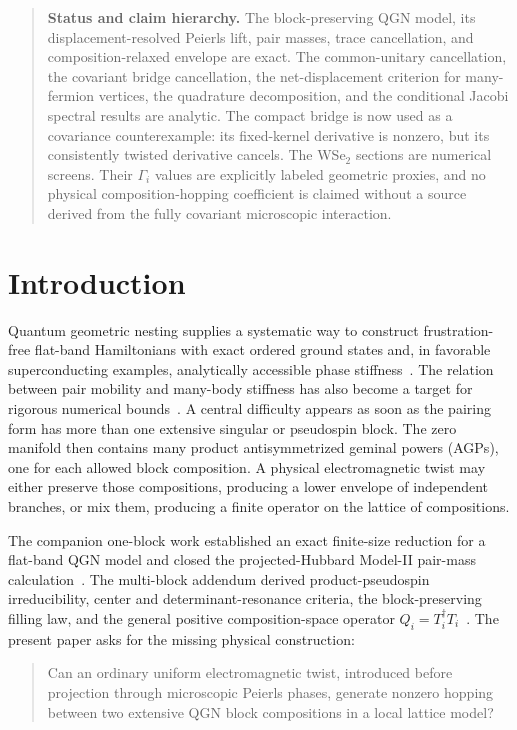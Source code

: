 \documentclass[11pt]{article}
\theoremstyle{remark}
\begin{document}
\begin{quote}\small
\textbf{Status and claim hierarchy.}
The block-preserving QGN model, its displacement-resolved Peierls lift, pair masses, trace cancellation, and composition-relaxed envelope are exact.  The common-unitary cancellation, the covariant bridge cancellation, the net-displacement criterion for many-fermion vertices, the quadrature decomposition, and the conditional Jacobi spectral results are analytic.  The compact bridge is now used as a covariance counterexample: its fixed-kernel derivative is nonzero, but its consistently twisted derivative cancels.  The WSe$_2$ sections are numerical screens.  Their $\Gamma_i$ values are explicitly labeled geometric proxies, and no physical composition-hopping coefficient is claimed without a source derived from the fully covariant microscopic interaction.
\end{quote}

\section{Introduction}

Quantum geometric nesting supplies a systematic way to construct frustration-free flat-band Hamiltonians with exact ordered ground states and, in favorable superconducting examples, analytically accessible phase stiffness~\cite{han2024}.  The relation between pair mobility and many-body stiffness has also become a target for rigorous numerical bounds~\cite{gao2026}.  A central difficulty appears as soon as the pairing form has more than one extensive singular or pseudospin block.  The zero manifold then contains many product antisymmetrized geminal powers (AGPs), one for each allowed block composition.  A physical electromagnetic twist may either preserve those compositions, producing a lower envelope of independent branches, or mix them, producing a finite operator on the lattice of compositions.

The companion one-block work established an exact finite-size reduction for a flat-band QGN model and closed the projected-Hubbard Model-II pair-mass calculation~\cite{parent}.  The multi-block addendum derived product-pseudospin irreducibility, center and determinant-resonance criteria, the block-preserving filling law, and the general positive composition-space operator $Q_i=T_i^\dagger T_i$~\cite{addendum}.  The present paper asks for the missing physical construction:
\begin{quote}
Can an ordinary uniform electromagnetic twist, introduced before projection through microscopic Peierls phases, generate nonzero hopping between two extensive QGN block compositions in a local lattice model?
\end{quote}
\end{document}
